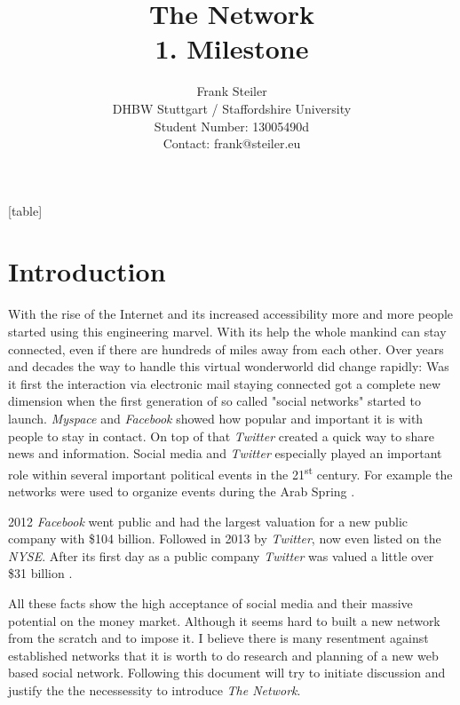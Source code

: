 \documentclass[11pt,a4paper]{report}
\title{The Network\\ 1. Milestone}
\author{Frank Steiler\\ DHBW Stuttgart / Staffordshire University\\ Student Number: 13005490d \\ Contact: frank@steiler.eu}
\begin{document}

[table]
\newcommand\rownumber{\stepcounter{magicrownumbers}\arabic{magicrownumbers}}

\maketitle

\newpage
\thispagestyle{empty}
\mbox{}
\setcounter{page}{0}

\tableofcontents

\chapter{Introduction}
With the rise of the Internet and its increased accessibility more and more people started using this engineering marvel. With its help the whole mankind can stay connected, even if there are hundreds of miles away from each other. Over years and decades the way to handle this virtual wonderworld did change rapidly: Was it first the interaction via electronic mail staying connected got a complete new dimension when the first generation of so called "social networks" started to launch. \emph{Myspace} and \emph{Facebook} showed how popular and important it is with people to stay in contact. On top of that \emph{Twitter} created a quick way to share news and information. Social media and \emph{Twitter} especially played an important role within several important political events in the 21\textsuperscript{st} century. For example the networks were used to organize events during the Arab Spring \cite{ICT4DBibliography2170}.

2012 \emph{Facebook} went public and had the largest valuation for a new public company with \$104 billion\cite{FinTimes12}. Followed in 2013 by \emph{Twitter}, now even listed on the \emph{NYSE}. After its first day as a public company \emph{Twitter} was valued a little over \$31 billion \cite{BBCNews13}.

All these facts show the high acceptance of social media and their massive potential on the money market. Although it seems hard to built a new network from the scratch and to impose it. I believe there is many resentment against established networks that it is worth to do research and planning of a new web based social network. Following this document will try to initiate discussion and justify the the necessessity to introduce \emph{The Network}.
\end{document}
